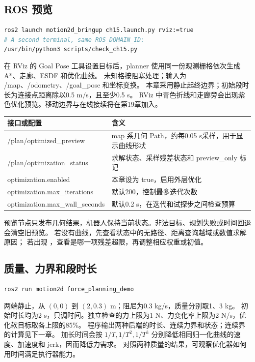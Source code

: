 \subsection{ROS 预览}
\begin{lstlisting}[language=bash]
ros2 launch motion2d_bringup ch15.launch.py rviz:=true
# A second terminal, same ROS_DOMAIN_ID:
/usr/bin/python3 scripts/check_ch15.py
\end{lstlisting}
在 RViz 的 Goal Pose 工具设置目标后，planner 使用同一份观测栅格依次生成 A*、走廊、ESDF 和优化曲线。
未知格按阻塞处理；输入为 /map、/odometry、/goal\_pose 和坐标变换。
本章采用静止起终边界；初始段时长为连接点距离除以0.5 m/s，且至少0.5 s。
RViz 中青色折线和走廊旁会出现紫色优化预览。移动边界与在线接续将在第19章加入。
\begin{center}\small
\begin{tabularx}{\linewidth}{lX}\toprule
接口或配置 & 含义\\\midrule
/plan/optimized\_preview & map 系几何 Path，约每0.05 s采样，用于显示曲线形状\\
/plan/optimization\_status & 求解状态、采样残差状态和 preview\_only 标记\\
optimization.enabled & 本章设为 true，启用外层优化\\
optimization.max\_iterations & 默认200，控制最多迭代次数\\
optimization.max\_wall\_seconds & 默认0.2 s，在迭代和试探步之间检查预算\\\bottomrule
\end{tabularx}
\end{center}
预览节点只发布几何结果，机器人保持当前状态。非法目标、规划失败或时间回退会清空旧预览。
若没有曲线，先查看状态中的无路径、距离查询越域或数值求解原因；
若出现 ，查看是哪一项残差超限，再调整相应权重或初值。

\clearpage
\subsection{质量、力界和段时长}
\begin{lstlisting}[language=bash,numbers=none]
ros2 run motion2d force_planning_demo
\end{lstlisting}
两端静止，从 $(0,0)$ 到 $(2,0.3)$ m；阻尼为0.3 kg/s，质量分别取1、3 kg。
初始时长均为2 s，只调时间。独立检查的力上限为1 N、力变化率上限为2 N/s，优化软目标取各上限的85\%。
程序输出两种后端的时长、连续力界和状态；连续界的计算见下一章。
加长时间会按 $1/T,1/T^2,1/T^3$ 分别降低相同归一化曲线的速度、加速度和 jerk，因而降低力需求。
对照两种质量的结果，可观察优化器如何用时间满足执行器能力。

